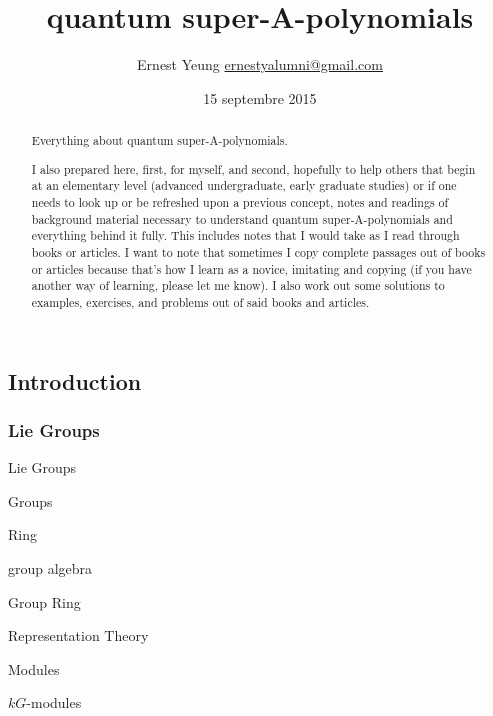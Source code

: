 \documentclass[10pt]{amsart}
\title{quantum super-A-polynomials}
\author{Ernest Yeung \href{mailto:ernestyalumni@gmail.com}{ernestyalumni@gmail.com}}
\date{15 septembre 2015}
\begin{document}

\maketitle
\begin{multicols*}{2}

\tableofcontents



\begin{abstract}
Everything about quantum super-A-polynomials.  

I also prepared here, first, for myself, and second, hopefully to help others that begin at an elementary level (advanced undergraduate, early graduate studies) or if one needs to look up or be refreshed upon a previous concept, notes and readings of background material necessary to understand quantum super-A-polynomials and everything behind it fully.  This includes notes that I would take as I read through books or articles.  I want to note that sometimes I copy complete passages out of books or articles because that's how I learn as a novice, imitating and copying (if you have another way of learning, please let me know).  I also work out some solutions to examples, exercises, and problems out of said books and articles.
\end{abstract}

\part{Introduction}

\section{Lie Groups}

\begin{description}
\item Lie Groups 
\item Groups
\item Ring
\item group algebra
\item Group Ring
\item Representation Theory
\item Modules
\item $kG$-modules
\end{description}


\end{multicols*}
\end{document}
